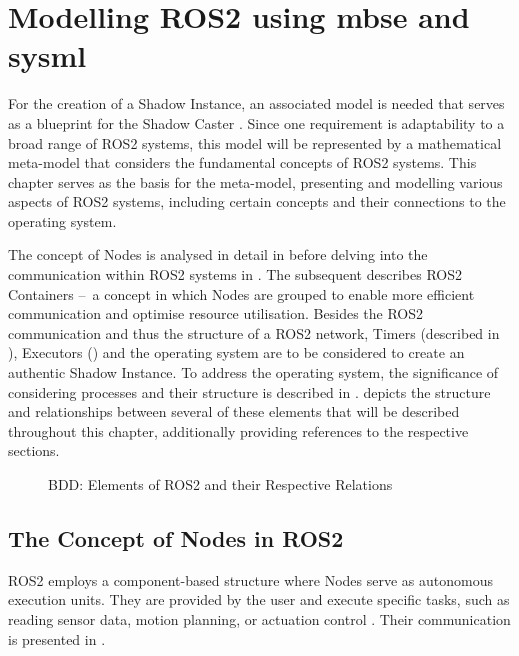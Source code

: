 \chapter{Modelling ROS2 using \acl{mbse} and \acs{sysml}} \label{chap:ros2systemModel}

For the creation of a Shadow Instance, an associated model is needed that serves as a blueprint for the Shadow Caster \cite{DSConceptualModelElsevier}\cite{DSConceptualModelSpringer}. Since one requirement is adaptability to a broad range of ROS2 systems, this model will be represented by a mathematical meta-model that considers the fundamental concepts of ROS2 systems.
This chapter serves as the basis for the meta-model, presenting and modelling various aspects of ROS2 systems, including certain concepts and their connections to the operating system.

The concept of Nodes is analysed in detail in  before delving into the communication within ROS2 systems in . The subsequent  describes ROS2 Containers --~a concept in which Nodes are grouped to enable more efficient communication and optimise resource utilisation.
Besides the ROS2 communication and thus the structure of a ROS2 network, Timers (described in ), Executors () and the operating system are to be considered to create an authentic Shadow Instance. To address the operating system, the significance of considering processes and their structure is described in .\newline
{} depicts the structure and relationships between several of these elements that will be described throughout this chapter, additionally providing references to the respective sections.
\begin{figure}[h]
    \centering
    
    \caption[Elements of ROS2 and their Respective Relations]{BDD: Elements of ROS2 and their Respective Relations} \label{fig:tikz:BDD:Components}
\end{figure}

\section{The Concept of Nodes in ROS2} \label{sec:model:node}
    ROS2 employs a component-based structure where Nodes serve as autonomous execution units. They are provided by the user and execute specific tasks, such as reading sensor data, motion planning, or actuation control \cite[p.~3f]{ROS2usesInTheWild}. Their communication is presented in .

